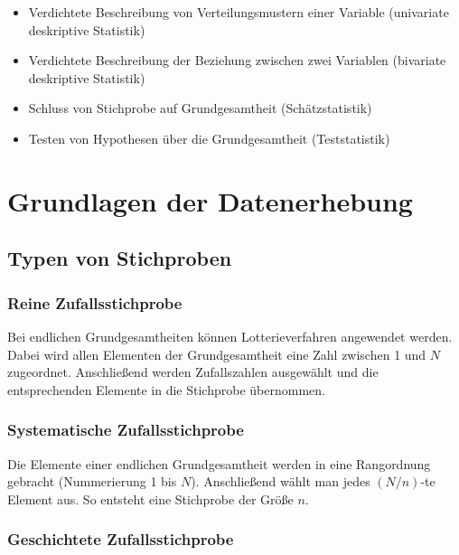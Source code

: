 \documentclass[
  11pt,
  ngerman,
  a4paper,
]{report}
\providecommand{\tightlist}{%
  \setlength{\itemsep}{0pt}\setlength{\parskip}{0pt}}
\begin{document}
\begin{itemize}
\tightlist
\item
  Verdichtete Beschreibung von Verteilungsmustern einer Variable (univariate deskriptive Statistik)
\item
  Verdichtete Beschreibung der Beziehung zwischen zwei Variablen (bivariate deskriptive Statistik)
\item
  Schluss von Stichprobe auf Grundgesamtheit (Schätzstatistik)
\item
  Testen von Hypothesen über die Grundgesamtheit (Teststatistik)
\end{itemize}

\hypertarget{grundlagen-der-datenerhebung}{%
\section{Grundlagen der Datenerhebung}\label{grundlagen-der-datenerhebung}}

\hypertarget{typen-von-stichproben}{%
\subsection{Typen von Stichproben}\label{typen-von-stichproben}}

\hypertarget{reine-zufallsstichprobe}{%
\subsubsection{Reine Zufallsstichprobe}\label{reine-zufallsstichprobe}}

Bei endlichen Grundgesamtheiten können Lotterieverfahren angewendet werden. Dabei wird allen Elementen der Grundgesamtheit eine Zahl zwischen 1 und \(N\) zugeordnet. Anschließend werden Zufallszahlen ausgewählt und die entsprechenden Elemente in die Stichprobe übernommen.

\hypertarget{systematische-zufallsstichprobe}{%
\subsubsection{Systematische Zufallsstichprobe}\label{systematische-zufallsstichprobe}}

Die Elemente einer endlichen Grundgesamtheit werden in eine Rangordnung gebracht (Nummerierung 1 bis \(N\)). Anschließend wählt man jedes \((N/n)\)-te Element aus. So entsteht eine Stichprobe der Größe \(n\).

\hypertarget{geschichtete-zufallsstichprobe}{%
\subsubsection{Geschichtete Zufallsstichprobe}\label{geschichtete-zufallsstichprobe}}
\end{document}
